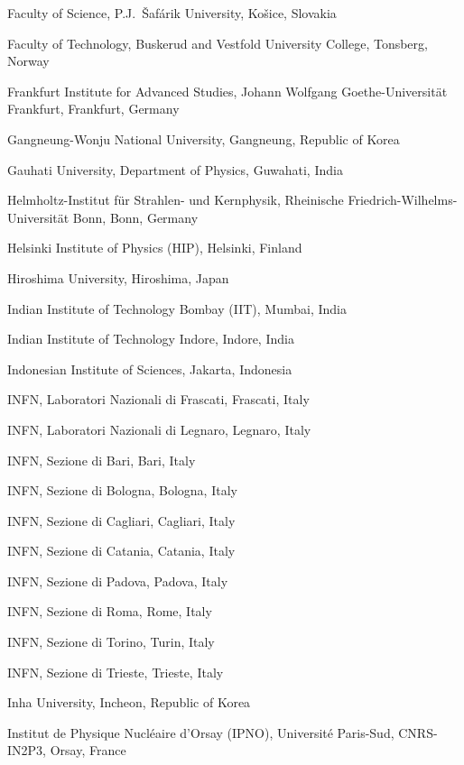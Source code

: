 \begin{flushleft}
\begin{Authlist}
\item {}Faculty of Science, P.J.~\v{S}af\'{a}rik University, Ko\v{s}ice, Slovakia
\item {}Faculty of Technology, Buskerud and Vestfold University College, Tonsberg, Norway
\item {}Frankfurt Institute for Advanced Studies, Johann Wolfgang Goethe-Universit\"{a}t Frankfurt, Frankfurt, Germany
\item {}Gangneung-Wonju National University, Gangneung, Republic of Korea
\item {}Gauhati University, Department of Physics, Guwahati, India
\item {}Helmholtz-Institut f\"{u}r Strahlen- und Kernphysik, Rheinische Friedrich-Wilhelms-Universit\"{a}t Bonn, Bonn, Germany
\item {}Helsinki Institute of Physics (HIP), Helsinki, Finland
\item {}Hiroshima University, Hiroshima, Japan
\item {}Indian Institute of Technology Bombay (IIT), Mumbai, India
\item {}Indian Institute of Technology Indore, Indore, India
\item {}Indonesian Institute of Sciences, Jakarta, Indonesia
\item {}INFN, Laboratori Nazionali di Frascati, Frascati, Italy
\item {}INFN, Laboratori Nazionali di Legnaro, Legnaro, Italy
\item {}INFN, Sezione di Bari, Bari, Italy
\item {}INFN, Sezione di Bologna, Bologna, Italy
\item {}INFN, Sezione di Cagliari, Cagliari, Italy
\item {}INFN, Sezione di Catania, Catania, Italy
\item {}INFN, Sezione di Padova, Padova, Italy
\item {}INFN, Sezione di Roma, Rome, Italy
\item {}INFN, Sezione di Torino, Turin, Italy
\item {}INFN, Sezione di Trieste, Trieste, Italy
\item {}Inha University, Incheon, Republic of Korea
\item {}Institut de Physique Nucl\'eaire d'Orsay (IPNO), Universit\'e Paris-Sud, CNRS-IN2P3, Orsay, France

\end{Authlist}
\end{flushleft}
